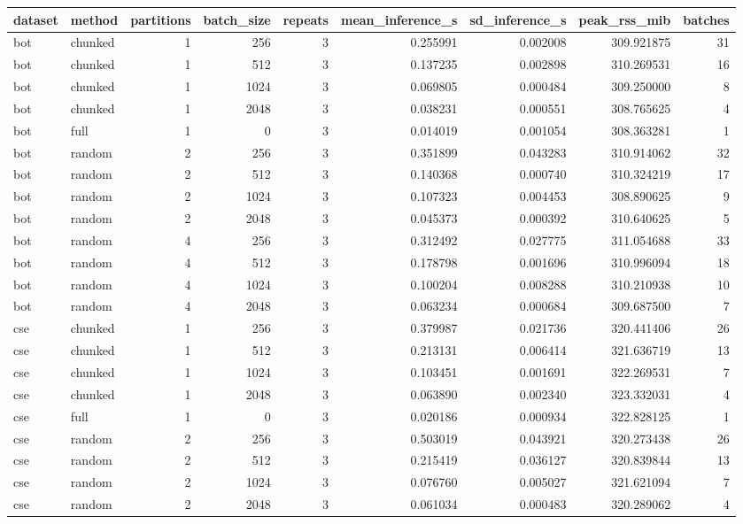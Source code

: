 \begin{tabular}{llrrrrrrr}
\toprule
dataset & method & partitions & batch_size & repeats & mean_inference_s & sd_inference_s & peak_rss_mib & batches \\
\midrule
bot & chunked & 1 & 256 & 3 & 0.255991 & 0.002008 & 309.921875 & 31 \\
bot & chunked & 1 & 512 & 3 & 0.137235 & 0.002898 & 310.269531 & 16 \\
bot & chunked & 1 & 1024 & 3 & 0.069805 & 0.000484 & 309.250000 & 8 \\
bot & chunked & 1 & 2048 & 3 & 0.038231 & 0.000551 & 308.765625 & 4 \\
bot & full & 1 & 0 & 3 & 0.014019 & 0.001054 & 308.363281 & 1 \\
bot & random & 2 & 256 & 3 & 0.351899 & 0.043283 & 310.914062 & 32 \\
bot & random & 2 & 512 & 3 & 0.140368 & 0.000740 & 310.324219 & 17 \\
bot & random & 2 & 1024 & 3 & 0.107323 & 0.004453 & 308.890625 & 9 \\
bot & random & 2 & 2048 & 3 & 0.045373 & 0.000392 & 310.640625 & 5 \\
bot & random & 4 & 256 & 3 & 0.312492 & 0.027775 & 311.054688 & 33 \\
bot & random & 4 & 512 & 3 & 0.178798 & 0.001696 & 310.996094 & 18 \\
bot & random & 4 & 1024 & 3 & 0.100204 & 0.008288 & 310.210938 & 10 \\
bot & random & 4 & 2048 & 3 & 0.063234 & 0.000684 & 309.687500 & 7 \\
cse & chunked & 1 & 256 & 3 & 0.379987 & 0.021736 & 320.441406 & 26 \\
cse & chunked & 1 & 512 & 3 & 0.213131 & 0.006414 & 321.636719 & 13 \\
cse & chunked & 1 & 1024 & 3 & 0.103451 & 0.001691 & 322.269531 & 7 \\
cse & chunked & 1 & 2048 & 3 & 0.063890 & 0.002340 & 323.332031 & 4 \\
cse & full & 1 & 0 & 3 & 0.020186 & 0.000934 & 322.828125 & 1 \\
cse & random & 2 & 256 & 3 & 0.503019 & 0.043921 & 320.273438 & 26 \\
cse & random & 2 & 512 & 3 & 0.215419 & 0.036127 & 320.839844 & 13 \\
cse & random & 2 & 1024 & 3 & 0.076760 & 0.005027 & 321.621094 & 7 \\
cse & random & 2 & 2048 & 3 & 0.061034 & 0.000483 & 320.289062 & 4 \\

\end{tabular}
